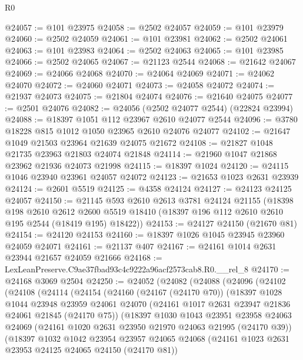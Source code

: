 \begin{lexlean}{R0}
\begin{coremodule}
@24057 := @101 @23975
@24058 := @2502 @24057
@24059 := @101 @23979
@24060 := @2502 @24059
@24061 := @101 @23981
@24062 := @2502 @24061
@24063 := @101 @23983
@24064 := @2502 @24063
@24065 := @101 @23985
@24066 := @2502 @24065
@24067 := @21123 @2544
@24068 := @21642 @24067
@24069 := @24066 @24068
@24070 := @24064 @24069
@24071 := @24062 @24070
@24072 := @24060 @24071
@24073 := @24058 @24072
@24074 := @21937 @24073
@24075 := @21804 @24074
@24076 := @21640 @24075
@24077 := @2501 @24076
@24082 := @24056 (@2502 @24077 @2544) (@22824 @23994)
@24088 := @18397 @1051 @112 @23967 @2610 @24077 @2544
@24096 := @3780 @18228 @815 @1012 @1050 @23965 @2610 @24076 @24077
@24102 := @21647 @1049 @21503 @23964 @21639 @24075 @21672
@24108 := @21827 @1048 @21735 @23963 @21803 @24074 @21848
@24114 := @21960 @1047 @21868 @23962 @21936 @24073 @21998
@24115 := @18397 @1024
@24120 := @24115 @1046 @23940 @23961 @24057 @24072
@24123 := @21653 @1023 @2631 @23939
@24124 := @2601 @5519
@24125 := @4358 @24124
@24127 := @24123 @24125 @24057
@24150 := @21145
    @593
    @2610
    @2613
    @3781
    @24124
    @21155
    (@18398
      @198
      @2610
      @2612
      @2600
      @5519
      @18410
      (@18397 @196 @112 @2610 @2610 @195 @2544 (@18419 @195) @18422))
@24153 := @24127 @24150 (@21670 @81)
@24154 := @24120 @24153
@24160 := @18397 @1026 @1045 @23945 @23960 @24059 @24071
@24161 := @21137 @407
@24167 := @24161 @1014 @2631 @23944 @21657 @24059 @21666
@24168 := LexLeanPreserve.C9ae37fbad93c4c9222a96acf2573cab8.R0.__rel_8
@24170 := @24168 @3069 @2504
@24250 := @24052
    (@24082
      (@24088
        (@24096
          (@24102
            (@24108
              (@24114
                (@24154
                  (@24160
                    (@24167 (@24170 @70))
                    (@18397
                      @1028
                      @1044
                      @23948
                      @23959
                      @24061
                      @24070
                      (@24161 @1017 @2631 @23947 @21836 @24061 @21845 (@24170 @75))
                      (@18397
                        @1030
                        @1043
                        @23951
                        @23958
                        @24063
                        @24069
                        (@24161 @1020 @2631 @23950 @21970 @24063 @21995 (@24170 @39))
                        (@18397
                          @1032
                          @1042
                          @23954
                          @23957
                          @24065
                          @24068
                          (@24161 @1023 @2631 @23953 @24125 @24065 @24150 (@24170 @81))

\end{coremodule}
\end{lexlean}
